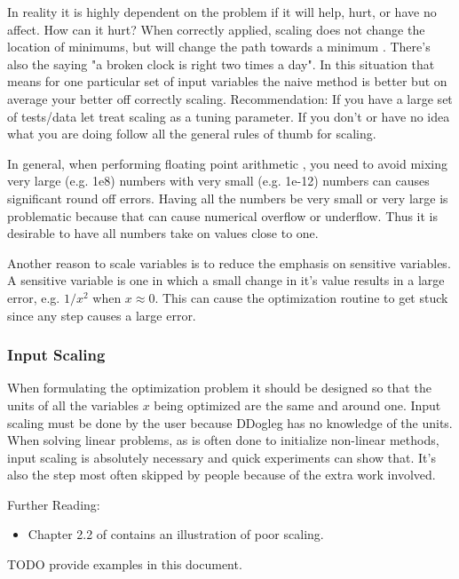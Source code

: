 \documentclass[peerreview,compsoc,onecolumn]{IEEEtran}
\begin{document}
In reality it is highly dependent on the problem if it will help, hurt, or have no affect. How can it hurt? When correctly applied, scaling does not change the location of minimums, but will change the path towards a minimum \cite{dennis1996}. There's also the saying "a broken clock is right two times a day". In this situation that means for one particular set of input variables the naive method is better but on average your better off correctly scaling. Recommendation: If you have a large set of tests/data let treat scaling as a tuning parameter. If you don't or have no idea what you are doing follow all the general rules of thumb for scaling.

In general, when performing floating point arithmetic \cite{goldberg1991every}, you need to avoid mixing very large (e.g. 1e8) numbers with very small (e.g. 1e-12) numbers can causes significant round off errors. Having all the numbers be very small or very large is problematic because that can cause numerical overflow or underflow. Thus it is desirable to have all numbers take on values close to one.

Another reason to scale variables is to reduce the emphasis on sensitive variables. A sensitive variable is one in which a small change in it's value results in a large error, e.g. $1/x^2$ when $x \approx 0$. This can cause the optimization routine to get stuck since any step causes a large error.

\subsubsection{Input Scaling}

When formulating the optimization problem it should be designed so that the units
of all the variables $x$ being optimized are the same and around one. Input scaling must be done by the user because DDogleg has no knowledge of the units. When solving linear problems, as is often done to initialize non-linear methods, input scaling is absolutely necessary and quick experiments can show that. It's also the step most often skipped by people because of the extra work involved.

Further Reading:
\begin{itemize}
\item Chapter 2.2 of \cite{numopt2006} contains an illustration of poor scaling.
\end{itemize}

TODO provide examples in this document.
\end{document}

